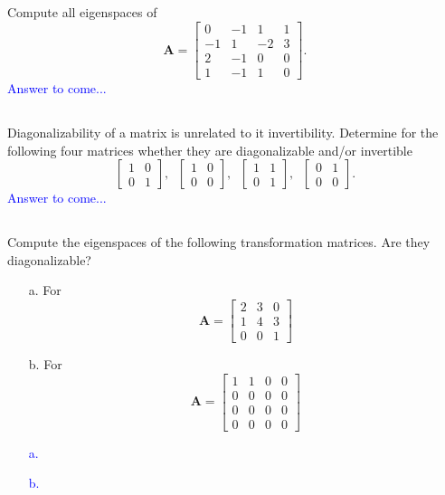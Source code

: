 \documentclass[a4paper,12pt]{article}
\newcommand{\M}[1]{ \begin{bmatrix} #1 \end{bmatrix} }
\newcommand{\matA}{\textbf{A}}
\begin{document}
\subsection{}
Compute all eigenspaces of 
$$\matA = \M{0&-1&1&1\\
                       -1&1&-2&3\\
                       2&-1&0&0\\
                       1&-1&1&0}.$$
\textcolor{blue}{
Answer to come...
}
\subsection{}
Diagonalizability of a matrix is unrelated to it invertibility. Determine for the following four matrices whether they are diagonalizable and/or invertible
$$\M{1&0\\0&1}, \;\; \M{1&0\\0&0}, \;\; \M{1&1\\0&1}, \;\; \M{0&1\\0&0}.$$
\textcolor{blue}{
Answer to come...
}
\subsection{}
Compute the eigenspaces of the following transformation matrices. Are they diagonalizable?
\begin{itemize}
 \item [a.] For $$\matA = \M{2&3&0\\1&4&3\\0&0&1}$$
 \item [b.] For $$\matA = \M{1&1&0&0\\0&0&0&0\\0&0&0&0\\0&0&0&0}$$
\end{itemize}
\textcolor{blue}{
\begin{itemize}
 \item [a.] 
 \item [b.] 
\end{itemize}
}
\end{document}
